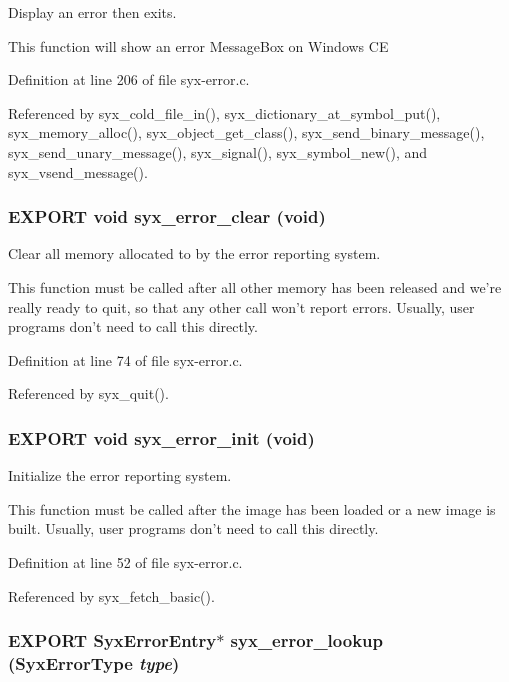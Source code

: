 Display an error then exits.

This function will show an error MessageBox on Windows CE 

Definition at line 206 of file syx-error.c.

Referenced by syx\_\-cold\_\-file\_\-in(), syx\_\-dictionary\_\-at\_\-symbol\_\-put(), syx\_\-memory\_\-alloc(), syx\_\-object\_\-get\_\-class(), syx\_\-send\_\-binary\_\-message(), syx\_\-send\_\-unary\_\-message(), syx\_\-signal(), syx\_\-symbol\_\-new(), and syx\_\-vsend\_\-message().\hypertarget{syx-error_8h_63b0a157b3a7fd7c288561556813094f}{
\subsubsection{\setlength{\rightskip}{0pt plus 5cm}EXPORT void syx\_\-error\_\-clear (void)}}
\label{syx-error_8h_63b0a157b3a7fd7c288561556813094f}


Clear all memory allocated to by the error reporting system.

This function must be called after all other memory has been released and we're really ready to quit, so that any other call won't report errors. Usually, user programs don't need to call this directly. 

Definition at line 74 of file syx-error.c.

Referenced by syx\_\-quit().\hypertarget{syx-error_8h_4b54eb4814b39373904c5e43c46cdf11}{
\subsubsection{\setlength{\rightskip}{0pt plus 5cm}EXPORT void syx\_\-error\_\-init (void)}}
\label{syx-error_8h_4b54eb4814b39373904c5e43c46cdf11}


Initialize the error reporting system.

This function must be called after the image has been loaded or a new image is built. Usually, user programs don't need to call this directly. 

Definition at line 52 of file syx-error.c.

Referenced by syx\_\-fetch\_\-basic().\hypertarget{syx-error_8h_89af9f1f8208fc5c7f81a1dc2c4bb3ea}{
\subsubsection{\setlength{\rightskip}{0pt plus 5cm}EXPORT {\bf SyxErrorEntry}$\ast$ syx\_\-error\_\-lookup ({\bf SyxErrorType} {\em type})}}
\label{syx-error_8h_89af9f1f8208fc5c7f81a1dc2c4bb3ea}


